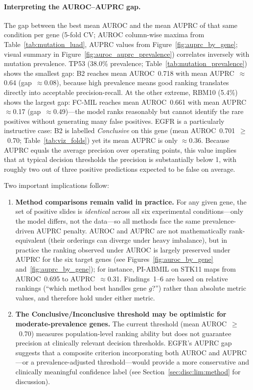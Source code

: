 \paragraph{Interpreting the AUROC--AUPRC gap.}
The gap between the best mean AUROC and the mean AUPRC of that same
condition per gene (5-fold CV; AUROC column-wise maxima from
Table~\ref{tab:mutation_luad}, AUPRC values from
Figure~\ref{fig:auprc_by_gene}; visual summary in
Figure~\ref{fig:auroc_auprc_prevalence}) correlates inversely with
mutation prevalence.
TP53 (38.0\% prevalence; Table~\ref{tab:mutation_prevalence}) shows
the smallest gap: B2 reaches mean AUROC~0.718 with
mean AUPRC~$\approx$0.64 (gap~$\approx$0.08),
because high prevalence means good ranking translates directly into
acceptable precision-recall.
At the other extreme, RBM10 (5.4\%) shows the largest gap: FC-MIL
reaches mean AUROC~0.661 with mean AUPRC~$\approx$0.17
(gap~$\approx$0.49)---the model ranks reasonably but cannot identify
the rare positives without generating many false positives.
EGFR is a particularly instructive case: B2 is labelled
\emph{Conclusive} on this gene (mean AUROC~0.701~$\geq$~0.70;
Table~\ref{tab:viz_folds}) yet its mean AUPRC is only $\approx$0.36.
Because AUPRC equals the average precision over operating points,
this value implies that at typical decision thresholds the precision
is substantially below 1, with roughly two out of three positive
predictions expected to be false on average.

Two important implications follow:
\begin{enumerate}
    \item \textbf{Method comparisons remain valid in practice.}
    For any given gene, the set of positive slides is \emph{identical}
    across all six experimental conditions---only the model differs,
    not the data---so all methods face the same prevalence-driven
    AUPRC penalty. AUROC and AUPRC are not mathematically
    rank-equivalent (their orderings can diverge under heavy
    imbalance), but in practice the ranking observed under AUROC is
    largely preserved under AUPRC for the six target genes (see
    Figures~\ref{fig:auroc_by_gene} and~\ref{fig:auprc_by_gene}); for
    instance, PI-ABMIL on STK11 maps from AUROC~0.695 to
    AUPRC~$\approx$0.31. Findings~1--6 are based on relative rankings
    (``which method best handles gene $g$?'') rather than absolute
    metric values, and therefore hold under either metric.

    \item \textbf{The Conclusive/Inconclusive threshold may be
    optimistic for moderate-prevalence genes.}
    The current threshold (mean AUROC~$\geq$~0.70) measures
    population-level ranking ability but does not guarantee precision
    at clinically relevant decision thresholds.
    EGFR's AUPRC gap suggests that a composite criterion incorporating
    both AUROC and AUPRC---or a prevalence-adjusted threshold---would
    provide a more conservative and clinically meaningful confidence
    label (see Section~\ref{sec:disc:lim:method} for discussion).
\end{enumerate}

